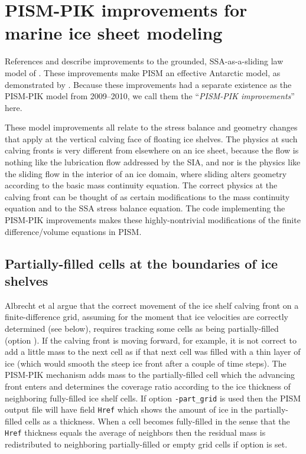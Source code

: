 

\section{PISM-PIK improvements for marine ice sheet modeling}
\label{sec:pism-pik}

References \cite{Albrechtetal2011} and \cite{Winkelmannetal2011} describe improvements to the grounded, SSA-as-a-sliding law model of \cite{BBssasliding}.  These improvements make PISM an effective Antarctic model, as demonstrated by \cite{Martinetal2011,Levermann2011}.  Because these improvements had a separate existence as the PISM-PIK model from 2009--2010, we call them the ``\emph{PISM-PIK improvements}'' here.

These model improvements all relate to the stress balance and geometry changes that apply at the vertical calving face of floating ice shelves.  The physics at such calving fronts is very different from elsewhere on an ice sheet, because the flow is nothing like the lubrication flow addressed by the SIA, and nor is the physics like the sliding flow in the interior of an ice domain, where sliding alters geometry according to the basic mass continuity equation.  The correct physics at the calving front can be thought of as certain modifications to the mass continuity equation and to the SSA stress balance equation.  The code implementing the PISM-PIK improvements makes these highly-nontrivial modifications of the finite difference/volume equations in PISM.

\subsection{Partially-filled cells at the boundaries of ice shelves}
\label{sec:part-grid}

Albrecht et al \cite{Albrechtetal2011} argue that the correct movement of the ice shelf calving front on a finite-difference grid, assuming for the moment that ice velocities are correctly determined (see below), requires tracking some cells as being partially-filled (option ). If the calving front is moving forward, for example, it is not correct to add a little mass to the next cell as if that next cell was filled with a thin layer of ice (which would smooth the steep ice front after a couple of time steps).  The PISM-PIK mechanism adds mass to the partially-filled cell which the advancing front enters and determines the coverage ratio according to the ice thickness of neighboring fully-filled ice shelf cells.  If option \texttt{-part_grid} is used then the PISM output file will have field \texttt{Href} which shows the amount of ice in the partially-filled cells as a thickness.  When a cell becomes fully-filled in the sense that the \texttt{Href} thickness equals the average of neighbors then the residual mass is redistributed to neighboring partially-filled or empty grid cells if option  is set.

